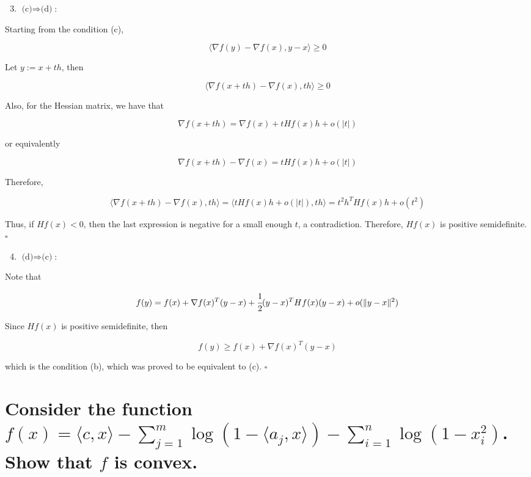 \documentclass[10pt]{article}
\begin{document}
\begin{enumerate}[label=(\alph*)]
  \setcounter{enumi}{2}
  \item $\text{(c)} \Rightarrow \text{(d)}$:
\end{enumerate}

Starting from the condition (c),

$$\langle \nabla f(y) - \nabla f(x), y - x \rangle \geq 0$$

Let $y:=x+th$, then 

$$\langle \nabla f(x+th) - \nabla f(x), th \rangle \geq 0$$

Also, for the Hessian matrix, we have that

$$\nabla f(x+th) = \nabla f(x) + t Hf(x)h + o(|t|)$$

or equivalently

$$\nabla f(x+th) - \nabla f(x) = t Hf(x)h + o(|t|)$$

Therefore,

$$\langle \nabla f(x+th) - \nabla f(x), th \rangle = \langle t Hf(x)h + o(|t|), th \rangle = t^2 h^T Hf(x)h + o(t^2)$$

Thus, if $Hf(x)<0$, then the last expression is negative for a small enough $t$, a contradiction. Therefore, $Hf(x)$ is positive semidefinite. $\square$

\begin{enumerate}[label=(\alph*)]
  \setcounter{enumi}{3}
  \item $\text{(d)} \Rightarrow \text{(c)}$:
\end{enumerate}

Note that 

$$f(y) = f(x) + \nabla f(x)^T(y-x) + \cfrac{1}{2} (y-x)^T Hf(x)(y-x) + o(\|y-x\|^2)$$

Since $Hf(x)$ is positive semidefinite, then

$$f(y) \geq f(x) + \nabla f(x)^T (y-x)$$

which is the condition (b), which was proved to be equivalent to (c). $\square$



\setcounter{section}{6}

\section{Consider the function $f(x) = \langle c, x \rangle - \displaystyle\sum_{j=1}^m \log(1 - \langle a_j, x \rangle) - \displaystyle\sum_{i=1}^n \log(1- x_i^2)$. Show that $f$ is convex.}
\end{document}
